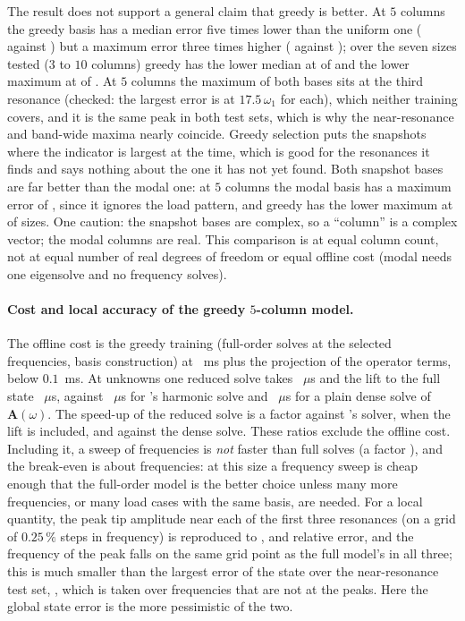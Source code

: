 The result does not support a general claim that greedy is better. At $5$ columns the greedy basis has a median error five times lower than the uniform one (\cfrGreedyMedFive{} against \cfrUniformMedFive{}) but a maximum error three times higher (\cfrGreedyNearFive{} against \cfrUniformNearFive{}); over the seven sizes tested ($3$ to $10$ columns) greedy has the lower median at \cfrGreedyWinsMed{} of \cfrRankCount{} and the lower maximum at \cfrGreedyWinsNear{} of \cfrRankCount{}. At $5$ columns the maximum of both bases sits at the third resonance (checked: the largest error is at $17.5\,\omega_1$ for each), which neither training covers, and it is the same peak in both test sets, which is why the near-resonance and band-wide maxima nearly coincide. Greedy selection puts the snapshots where the indicator is largest at the time, which is good for the resonances it finds and says nothing about the one it has not yet found. Both snapshot bases are far better than the modal one: at $5$ columns the modal basis has a maximum error of \cfrModalNearFive{}, since it ignores the load pattern, and greedy has the lower maximum at \cfrGreedyWinsModal{} of \cfrRankCount{} sizes. One caution: the snapshot bases are complex, so a ``column'' is a complex vector; the modal columns are real. This comparison is at equal column count, not at equal number of real degrees of freedom or equal offline cost (modal needs one eigensolve and no frequency solves).

\paragraph{Cost and local accuracy of the greedy $5$-column model.} The offline cost is the greedy training (full-order solves at the selected frequencies, basis construction) at \cfrTimeGreedyMs~ms plus the projection of the operator terms, below $0.1$~ms. At \cfrNFree{} unknowns one reduced solve takes \cfrTimeOnUs~$\mu$s and the lift to the full state \cfrTimeRecUs~$\mu$s, against \cfrTimeFullUs~$\mu$s for \fea{}'s harmonic solve and \cfrTimeDenseUs~$\mu$s for a plain dense solve of $\bm A(\omega)$. The speed-up of the reduced solve is a factor \cfrSpeedOnline{} against \fea{}'s solver, \cfrSpeedLift{} when the lift is included, and \cfrSpeedDense{} against the dense solve. These ratios exclude the offline cost. Including it, a sweep of \cfrWorkflowQ{} frequencies is \emph{not} faster than \cfrWorkflowQ{} full solves (a factor \cfrWorkflowSpeed), and the break-even is about \cfrBreakEven{} frequencies: at this size a frequency sweep is cheap enough that the full-order model is the better choice unless many more frequencies, or many load cases with the same basis, are needed. For a local quantity, the peak tip amplitude near each of the first three resonances (on a grid of $0.25\,\%$ steps in frequency) is reproduced to \cfrPeakAmpOne{}, \cfrPeakAmpTwo{} and \cfrPeakAmpThree{} relative error, and the frequency of the peak falls on the same grid point as the full model's in all three; this is much smaller than the largest error of the state over the near-resonance test set, \cfrPeakGlobal{}, which is taken over frequencies that are not at the peaks. Here the global state error is the more pessimistic of the two.


